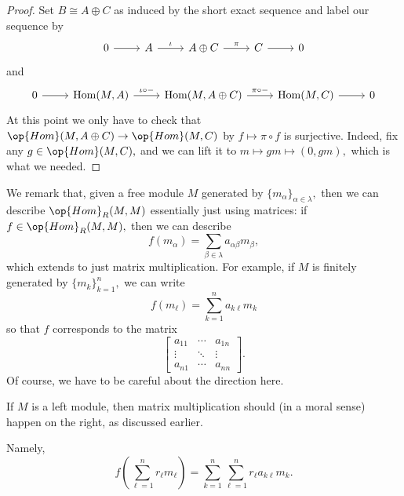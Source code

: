 \begin{proof}
	Set $B\cong A\oplus C$ as induced by the short exact sequence and label our sequence by
	\[\begin{tikzcd}
		0 & A & {A\oplus C} & C & 0
		\arrow[from=1-1, to=1-2]
		\arrow["\iota", from=1-2, to=1-3]
		\arrow["\pi", from=1-3, to=1-4]
		\arrow[from=1-4, to=1-5]
	\end{tikzcd}\]
	and
	\[\begin{tikzcd}
		0 & {\operatorname{Hom}(M,A)} & {\operatorname{Hom}(M,A\oplus C)} & {\operatorname{Hom}(M,C)} & 0
		\arrow[from=1-1, to=1-2]
		\arrow["{\iota\circ-}", from=1-2, to=1-3]
		\arrow["{\pi\circ-}", from=1-3, to=1-4]
		\arrow[from=1-4, to=1-5]
	\end{tikzcd}\]
	At this point we only have to check that $\op{Hom}(M,A\oplus C)\to\op{Hom}(M,C)$ by $f\mapsto\pi\circ f$ is surjective. Indeed, fix any $g\in\op{Hom}(M,C),$ and we can lift it to $m\mapsto gm\mapsto(0,gm),$ which is what we needed.
\end{proof}
We remark that, given a free module $M$ generated by $\{m_\alpha\}_{\alpha\in\lambda},$ then we can describe $\op{Hom}_R(M,M)$ essentially just using matrices: if $f\in\op{Hom}_R(M,M),$ then we can describe
\[f(m_\alpha)=\sum_{\beta\in\lambda}a_{\alpha\beta}m_\beta,\]
which extends to just matrix multiplication. For example, if $M$ is finitely generated by $\{m_k\}_{k=1}^n,$ we can write
\[f(m_\ell)=\sum_{k=1}^na_{k\ell}m_k\]
so that $f$ corresponds to the matrix
\[\begin{bmatrix}
	a_{11} & \cdots & a_{1n} \\
	\vdots & \ddots & \vdots \\
	a_{n1} & \cdots & a_{nn}
\end{bmatrix}.\]
Of course, we have to be careful about the direction here.
\begin{warn}
	If $M$ is a left module, then matrix multiplication should (in a moral sense) happen on the right, as discussed earlier.
\end{warn}
Namely,
\[f\left(\sum_{\ell=1}^nr_\ell m_\ell\right)=\sum_{k=1}^n\sum_{\ell=1}^nr_\ell a_{k\ell}m_k.\]
